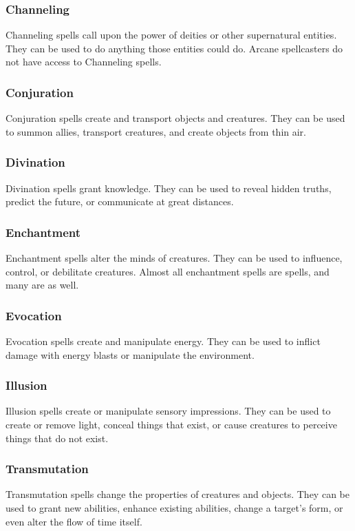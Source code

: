         \subsubsection{Channeling}
            Channeling spells call upon the power of deities or other supernatural entities. They can be used to do anything those entities could do. Arcane spellcasters do not have access to Channeling spells.

        \subsubsection{Conjuration}
            Conjuration spells create and transport objects and creatures. They can be used to summon allies, transport creatures, and create objects from thin air.

        \subsubsection{Divination}
            Divination spells grant knowledge. They can be used to reveal hidden truths, predict the future, or communicate at great distances.

        \subsubsection{Enchantment}
            Enchantment spells alter the minds of creatures. They can be used to influence, control, or debilitate creatures. Almost all enchantment spells are  spells, and many are  as well.

        \subsubsection{Evocation}
            Evocation spells create and manipulate energy. They can be used to inflict damage with energy blasts or manipulate the environment.

        \subsubsection{Illusion}
            Illusion spells create or manipulate sensory impressions. They can be used to create or remove light, conceal things that exist, or cause creatures to perceive things that do not exist.

        \subsubsection{Transmutation}
            Transmutation spells change the properties of creatures and objects. They can be used to grant new abilities, enhance existing abilities, change a target's form, or even alter the flow of time itself.

